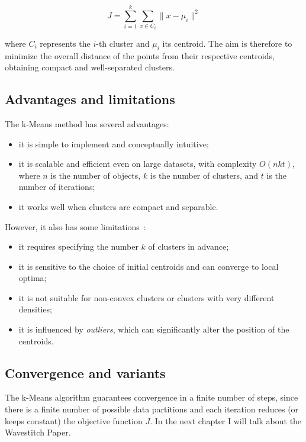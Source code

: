 \[
J = \sum_{i=1}^{k} \sum_{x \in C_i} \| x - \mu_i \|^2
\]

where $C_i$ represents the $i$-th cluster and $\mu_i$ its centroid.  
The aim is therefore to minimize the overall distance of the points from their respective centroids, obtaining compact and well-separated clusters.

\subsection{Advantages and limitations}

The k-Means method has several advantages:
\begin{itemize}
  \item it is simple to implement and conceptually intuitive;
  \item it is scalable and efficient even on large datasets, with complexity $O(nkt)$, where $n$ is the number of objects, $k$ is the number of clusters, and $t$ is the number of iterations;
  \item it works well when clusters are compact and separable.
\end{itemize}

However, it also has some limitations~\cite{jain2010data}:
\begin{itemize}
  \item it requires specifying the number $k$ of clusters in advance;
  \item it is sensitive to the choice of initial centroids and can converge to local optima;
  \item it is not suitable for non-convex clusters or clusters with very different densities;
  \item it is influenced by \emph{outliers}, which can significantly alter the position of the centroids.
\end{itemize}

\subsection{Convergence and variants}

The k-Means algorithm guarantees convergence in a finite number of steps, since there is a finite number of possible data partitions and each iteration reduces (or keeps constant) the objective function $J$. In the next chapter I will talk about the Wavestitch Paper. 
